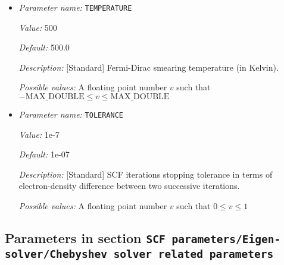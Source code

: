 \begin{itemize}
{\it Default:} RANDOM


{\it Description:} [Standard] Sets the type of the starting Kohn-Sham wavefunctions guess: Atomic(Superposition of single atom atomic orbitals. Wavefunctions for which atomic orbitals are not available, random wavefunctions are taken. Currently, atomic orbitals data is not available for all atoms.), Random(The starting guess for all wavefunctions are taken to be random). Default: RANDOM.


{\it Possible values:} Any one of ATOMIC, RANDOM
\item {\it Parameter name:} {\tt TEMPERATURE}
\label{parameters:SCF parameters/TEMPERATURE}
\label{parameters:SCF_20parameters/TEMPERATURE}


{\it Value:} 500


{\it Default:} 500.0


{\it Description:} [Standard] Fermi-Dirac smearing temperature (in Kelvin).


{\it Possible values:} A floating point number $v$ such that $-\text{MAX\_DOUBLE} \leq v \leq \text{MAX\_DOUBLE}$
\item {\it Parameter name:} {\tt TOLERANCE}
\label{parameters:SCF parameters/TOLERANCE}
\label{parameters:SCF_20parameters/TOLERANCE}


{\it Value:} 1e-7


{\it Default:} 1e-07


{\it Description:} [Standard] SCF iterations stopping tolerance in terms of electron-density difference between two successive iterations.


{\it Possible values:} A floating point number $v$ such that $0 \leq v \leq 1$
\end{itemize}



\subsection{Parameters in section \tt SCF parameters/Eigen-solver/Chebyshev solver related parameters}
\label{parameters:SCF_20parameters/Eigen_2dsolver_2fChebyshev_20solver_20related_20parameters}


